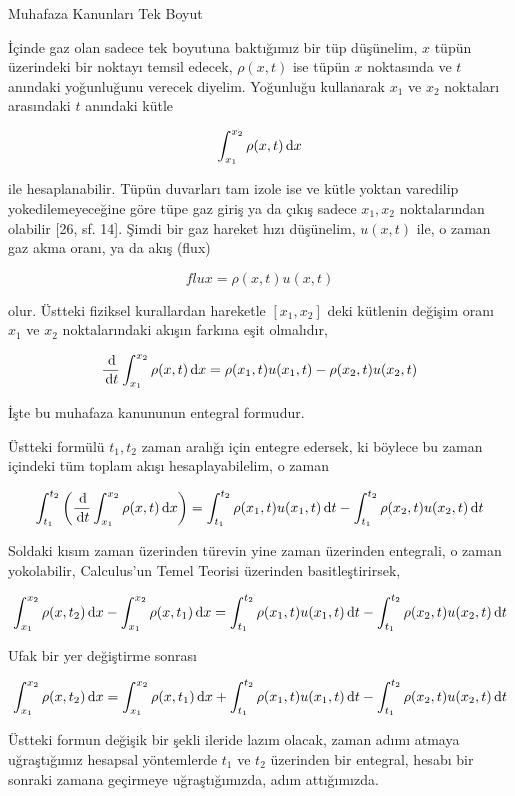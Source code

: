 \documentclass[12pt,fleqn]{article}\usepackage{../../common}
\begin{document}
Muhafaza Kanunları Tek Boyut

İçinde gaz olan sadece tek boyutuna baktığımız bir tüp düşünelim, $x$ tüpün
üzerindeki bir noktayı temsil edecek, $\rho(x,t)$ ise tüpün $x$ noktasında ve
$t$ anındaki yoğunluğunu verecek diyelim. Yoğunluğu kullanarak $x_1$ ve $x_2$
noktaları arasındaki $t$ anındaki kütle

$$
\int_{x_1}^{x_2} \rho(x,t) \,\mathrm{d} x
$$

ile hesaplanabilir. Tüpün duvarları tam izole ise ve kütle yoktan varedilip
yokedilemeyeceğine göre tüpe gaz giriş ya da çıkış sadece $x_1,x_2$
noktalarından olabilir [26, sf. 14]. Şimdi bir gaz hareket hızı düşünelim,
$u(x,t)$ ile, o zaman gaz akma oranı, ya da akış (flux)

$$
flux = \rho(x,t) u(x,t)
$$

olur. Üstteki fiziksel kurallardan hareketle $[x_1,x_2]$ deki kütlenin
değişim oranı $x_1$ ve $x_2$ noktalarındaki akışın farkına eşit olmalıdır,

$$
\frac{\,\mathrm{d}}{\,\mathrm{d} t} \int_{x_1}^{x_2} \rho(x,t) \,\mathrm{d} x =
\rho(x_1,t) u(x_1,t) - \rho(x_2,t) u(x_2,t)
$$

İşte bu muhafaza kanununun entegral formudur. 

Üstteki formülü $t_1,t_2$ zaman aralığı için entegre edersek, ki böylece
bu zaman içindeki tüm toplam akışı hesaplayabilelim, o zaman

$$
\int_{t_1}^{t_2} \left( \frac{\,\mathrm{d}}{\,\mathrm{d} t} \int_{x_1}^{x_2} \rho(x,t) \,\mathrm{d} x  \right)  =
\int_{t_1}^{t_2} \rho(x_1,t) u(x_1,t) \,\mathrm{d} t -
\int_{t_1}^{t_2} \rho(x_2,t) u(x_2,t) \,\mathrm{d} t
$$

Soldaki kısım zaman üzerinden türevin yine zaman üzerinden entegrali, o zaman
yokolabilir, Calculus'un Temel Teorisi üzerinden basitleştirirsek,

$$
\int_{x_1}^{x_2} \rho(x,t_2) \,\mathrm{d} x -
\int_{x_1}^{x_2} \rho(x,t_1) \,\mathrm{d} x  = 
\int_{t_1}^{t_2} \rho(x_1,t) u(x_1,t) \,\mathrm{d} t -
\int_{t_1}^{t_2}  \rho(x_2,t) u(x_2,t) \,\mathrm{d} t
$$

Ufak bir yer değiştirme sonrası

$$
\int_{x_1}^{x_2} \rho(x,t_2) \,\mathrm{d} x =
\int_{x_1}^{x_2} \rho(x,t_1) \,\mathrm{d} x  +
\int_{t_1}^{t_2} \rho(x_1,t) u(x_1,t) \,\mathrm{d} t -
\int_{t_1}^{t_2}  \rho(x_2,t) u(x_2,t) \,\mathrm{d} t
$$

Üstteki formun değişik bir şekli ileride lazım olacak, zaman adımı atmaya
uğraştığımız hesapsal yöntemlerde $t_1$ ve $t_2$ üzerinden bir entegral, hesabı
bir sonraki zamana geçirmeye uğraştığımızda, adım attığımızda.
\end{document}
